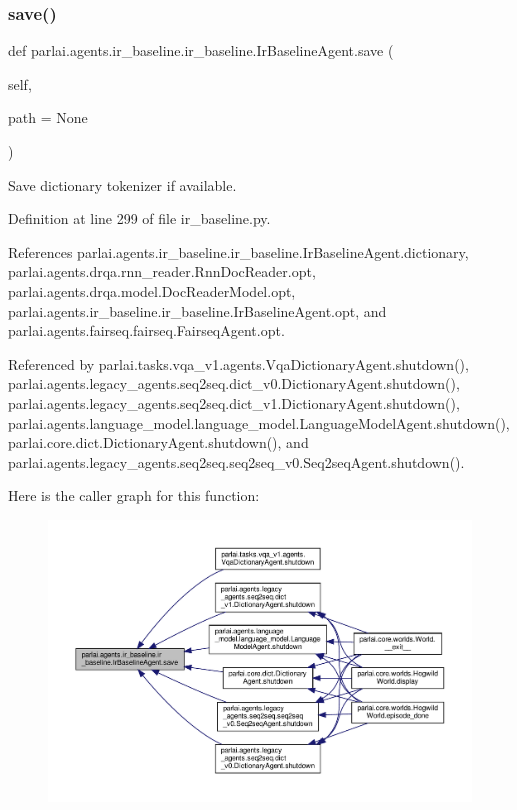 \subsubsection{\texorpdfstring{save()}{save()}}
{\footnotesize\ttfamily def parlai.\+agents.\+ir\+\_\+baseline.\+ir\+\_\+baseline.\+Ir\+Baseline\+Agent.\+save (\begin{DoxyParamCaption}\item[{}]{self,  }\item[{}]{path = {\ttfamily None} }\end{DoxyParamCaption})}

\begin{DoxyVerb}Save dictionary tokenizer if available.\end{DoxyVerb}
 

Definition at line 299 of file ir\+\_\+baseline.\+py.



References parlai.\+agents.\+ir\+\_\+baseline.\+ir\+\_\+baseline.\+Ir\+Baseline\+Agent.\+dictionary, parlai.\+agents.\+drqa.\+rnn\+\_\+reader.\+Rnn\+Doc\+Reader.\+opt, parlai.\+agents.\+drqa.\+model.\+Doc\+Reader\+Model.\+opt, parlai.\+agents.\+ir\+\_\+baseline.\+ir\+\_\+baseline.\+Ir\+Baseline\+Agent.\+opt, and parlai.\+agents.\+fairseq.\+fairseq.\+Fairseq\+Agent.\+opt.



Referenced by parlai.\+tasks.\+vqa\+\_\+v1.\+agents.\+Vqa\+Dictionary\+Agent.\+shutdown(), parlai.\+agents.\+legacy\+\_\+agents.\+seq2seq.\+dict\+\_\+v0.\+Dictionary\+Agent.\+shutdown(), parlai.\+agents.\+legacy\+\_\+agents.\+seq2seq.\+dict\+\_\+v1.\+Dictionary\+Agent.\+shutdown(), parlai.\+agents.\+language\+\_\+model.\+language\+\_\+model.\+Language\+Model\+Agent.\+shutdown(), parlai.\+core.\+dict.\+Dictionary\+Agent.\+shutdown(), and parlai.\+agents.\+legacy\+\_\+agents.\+seq2seq.\+seq2seq\+\_\+v0.\+Seq2seq\+Agent.\+shutdown().

Here is the caller graph for this function\+:
\nopagebreak
\begin{figure}[H]
\begin{center}
\leavevmode
\includegraphics[width=350pt]{classparlai_1_1agents_1_1ir__baseline_1_1ir__baseline_1_1IrBaselineAgent_af0deeaf3d545dac60187f95d30b48171_icgraph}
\end{center}
\end{figure}


